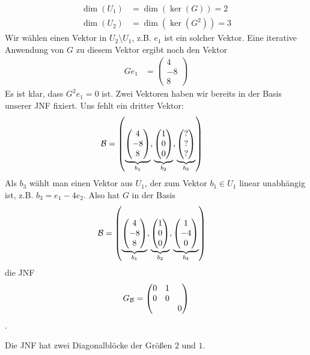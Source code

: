 \begin{bspe}
\begin{enumerate}
			\begin{align*}
				\dim(U_1) &= \dim(\ker(G)) = 2 \\
				\dim(U_2) &= \dim(\ker(G^2)) = 3
			\end{align*}
			Wir wählen einen Vektor in $ U_2 \setminus U_1 $, z.B. $ e_1 $ ist ein solcher Vektor. Eine iterative Anwendung von $G$ zu diesem Vektor ergibt noch den Vektor
			\begin{align*}
				G e_1 &= \begin{pmatrix}
					4 \\ -8 \\ 8
				\end{pmatrix} 
			\end{align*}
			Es ist klar, dass $G^2 e_1 = 0$ ist. Zwei Vektoren haben wir bereits in der Basis unserer JNF fixiert. Uns fehlt ein dritter Vektor: 
			\begin{align*}
				\mathcal{B} &= \left( \underbrace{\begin{pmatrix}
					4 \\ -8 \\ 8
				\end{pmatrix}}_{b_1}, \underbrace{\begin{pmatrix}
					1 \\ 0 \\ 0
				\end{pmatrix}}_{b_2}, \underbrace{\begin{pmatrix}
					? \\ ? \\ ?
				\end{pmatrix}}_{b_3} \right)
			\end{align*}
			Als $ b_3 $ wählt man einen Vektor aus $ U_1 $, der zum Vektor $ b_1 \in U_1 $ linear unabhängig ist, z.B. $ b_3 = e_1 - 4e_2 $. Also hat $G$ in der Basis
			\begin{align*}
\mathcal{B} &= \left( \underbrace{\begin{pmatrix}
	4 \\ -8 \\ 8
	\end{pmatrix}}_{b_1}, \underbrace{\begin{pmatrix}
	1 \\ 0 \\ 0
	\end{pmatrix}}_{b_2}, \underbrace{\begin{pmatrix}
	1 \\ -4 \\ 0
	\end{pmatrix}}_{b_3} \right)
\end{align*}
			 die JNF 
			\begin{equation*}
				G_{\mathcal{B}} = \begin{pmatrix}
					0 & 1 & \\
					0 & 0 & \\
					&& 0
				\end{pmatrix}
			\end{equation*}.
	\end{enumerate}
	Die JNF hat zwei Diagonalblöcke der Größen $2$ und $1$. 
\end{bspe}

